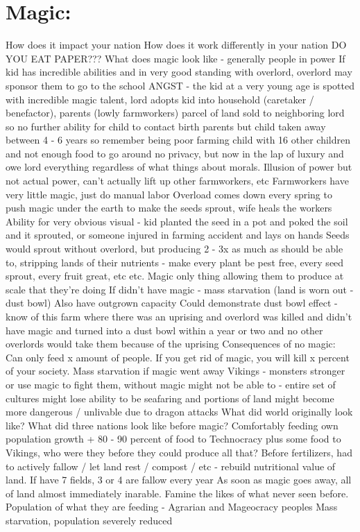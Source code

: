 \documentclass[blue]{GL2020}
\begin{document}
\section{Magic:}

How does it impact your nation
How does it work differently in your nation
DO YOU EAT PAPER???
What does magic look like - generally people in power
If kid has incredible abilities and in very good standing with overlord, overlord may sponsor them to go to the school
ANGST - the kid at a very young age is spotted with incredible magic talent, lord adopts kid into household (caretaker / benefactor), parents (lowly farmworkers) parcel of land sold to neighboring lord so no further ability for child to contact birth parents but child taken away between 4 - 6 years so remember being poor farming child with 16 other children and not enough food to go around no privacy, but now in the lap of luxury and owe lord everything regardless of what things about morals.  
Illusion of power but not actual power, can’t actually lift up other farmworkers, etc
Farmworkers have very little magic, just do manual labor
Overload comes down every spring to push magic under the earth to make the seeds sprout, wife heals the workers
Ability for very obvious visual - kid planted the seed in a pot and poked the soil and it sprouted, or someone injured in farming accident and lays on hands
Seeds would sprout without overlord, but producing 2 - 3x as much as should be able to, stripping lands of their nutrients - make every plant be pest free, every seed sprout, every fruit great, etc etc.  Magic only thing allowing them to produce at scale that they’re doing
If didn’t have magic - mass starvation (land is worn out - dust bowl)  Also have outgrown capacity
Could demonstrate dust bowl effect - know of this farm where there was an uprising and overlord was killed and didn’t have magic and turned into a dust bowl within a year or two and no other overlords would take them because of the uprising
Consequences of no magic:
Can only feed x amount of people.  If you get rid of magic, you will kill x percent of your society.  Mass starvation if magic went away
Vikings - monsters stronger or use magic to fight them, without magic might not be able to - entire set of cultures might lose ability to be seafaring and portions of land might become more dangerous / unlivable due to dragon attacks
What did world originally look like?  What did three nations look like before magic?
Comfortably feeding own population growth + 80 - 90 percent of food to Technocracy plus some food to Vikings, who were they before they could produce all that?
Before fertilizers, had to actively fallow / let land rest / compost / etc - rebuild nutritional value of land.  If have 7 fields, 3 or 4 are fallow every year
As soon as magic goes away, all of land almost immediately inarable.  Famine the likes of what never seen before.  Population of what they are feeding - Agrarian and Mageocracy peoples
Mass starvation, population severely reduced
\end{document}

